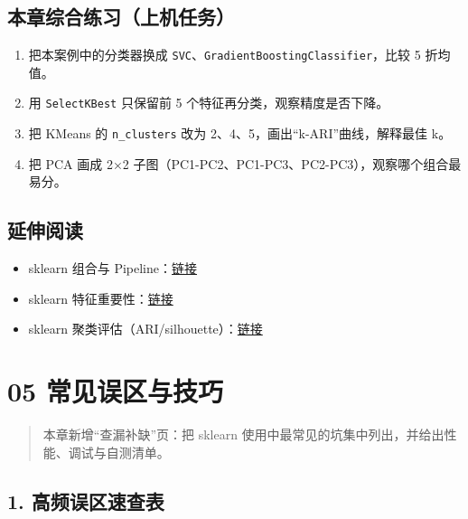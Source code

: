 \subsection{本章综合练习（上机任务）}\label{ux672cux7ae0ux7efcux5408ux7ec3ux4e60ux4e0aux673aux4efbux52a1-3}

\begin{enumerate}
\def\labelenumi{\arabic{enumi}.}
\tightlist
\item
  把本案例中的分类器换成
  \texttt{SVC}、\texttt{GradientBoostingClassifier}，比较 5 折均值。
\item
  用 \texttt{SelectKBest} 只保留前 5 个特征再分类，观察精度是否下降。
\item
  把 KMeans 的 \texttt{n\_clusters} 改为
  2、4、5，画出``k-ARI''曲线，解释最佳 k。
\item
  把 PCA 画成 2×2
  子图（PC1-PC2、PC1-PC3、PC2-PC3），观察哪个组合最易分。
\end{enumerate}

\subsection{延伸阅读}\label{ux5ef6ux4f38ux9605ux8bfb-37}

\begin{itemize}
\tightlist
\item
  sklearn 组合与
  Pipeline：\href{https://scikit-learn.org/stable/modules/compose.html}{链接}
\item
  sklearn
  特征重要性：\href{https://scikit-learn.org/stable/modules/ensemble.html\#feature-importance}{链接}
\item
  sklearn
  聚类评估（ARI/silhouette）：\href{https://scikit-learn.org/stable/modules/clustering.html\#clustering-performance-evaluation}{链接}
\end{itemize}

\section{05
常见误区与技巧}\label{ux5e38ux89c1ux8befux533aux4e0eux6280ux5de7-7}

\begin{quote}
本章新增``查漏补缺''页：把 sklearn
使用中最常见的坑集中列出，并给出性能、调试与自测清单。
\end{quote}

\subsection{1.
高频误区速查表}\label{ux9ad8ux9891ux8befux533aux901fux67e5ux8868-7}

